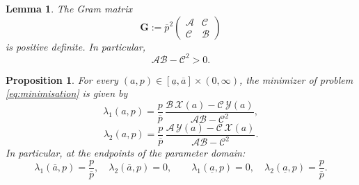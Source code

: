 \documentclass[10pt,a4paper]{amsart}
\newtheorem{lemma}{Lemma}
\newtheorem{proposition}{Proposition}
\begin{document}
\begin{lemma}\label{lem:gram}
The Gram matrix
\[
\mathbf{G}:=\overline{p}^2\begin{pmatrix}
\mathcal{A} & \mathcal{C}\\
\mathcal{C} & \mathcal{B}
\end{pmatrix}
\]
is positive definite. In particular,
\[
\mathcal{A}\mathcal{B}-\mathcal{C}^2>0.
\]
\end{lemma}

\begin{proposition}\label{prop:lambdas-explicit}
For every $(a,p)\in[\underline{a},\overline{a}]\times(0,\infty)$, the minimizer of
problem \eqref{eq:minimisation} is given by
\begin{equation}\label{eq:lambda1-formula}
\lambda_1(a,p)
=
\frac{p}{\overline{p}}\,\frac{\mathcal{B}\,\mathcal{X}(a)-\mathcal{C}\,\mathcal{Y}(a)}
                             {\mathcal{A}\mathcal{B}-\mathcal{C}^2},
\end{equation}
\begin{equation}\label{eq:lambda2-formula}
\lambda_2(a,p)
=
\frac{p}{\overline{p}}\,\frac{\mathcal{A}\,\mathcal{Y}(a)-\mathcal{C}\,\mathcal{X}(a)}
                             {\mathcal{A}\mathcal{B}-\mathcal{C}^2}.
\end{equation}
In particular, at the endpoints of the parameter domain:
\[
\lambda_1(\overline{a},p)=\frac{p}{\overline{p}},\quad
\lambda_2(\overline{a},p)=0,
\qquad
\lambda_1(\underline{a},p)=0,\quad
\lambda_2(\underline{a},p)=\frac{p}{\overline{p}}.
\]
\end{proposition}
\end{document}
